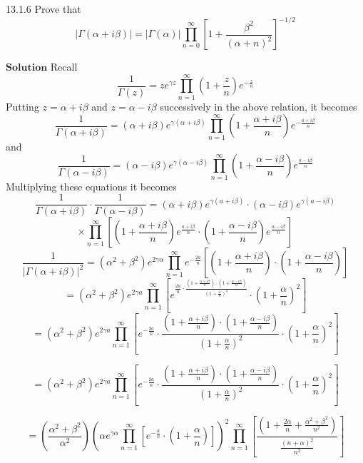 \documentclass{article}
\begin{document}
\begin{flushleft}
\newpage

\begin{mybox}{13.1.6}
Prove that 
$$|\Gamma(\alpha+i \beta)|=|\Gamma(\alpha)| \prod_{n=0}^{\infty}\left[1+\frac{\beta^{2}}{(\alpha+n)^{2}}\right]^{-1 / 2}$$
\end{mybox}

$\boxed{\textbf{Solution}}$ Recall 
$$
\frac{1}{\Gamma(z)}=z e^{\gamma z} \prod_{n=1}^{\infty}\left(1+\frac{z}{n}\right) e^{-\frac{z}{n}}
$$
Putting $z=\alpha+i \beta$ and $z=\alpha-i \beta$ successively in the above relation, it becomes
$$
\frac{1}{\Gamma(\alpha+i \beta)}=(\alpha+i \beta) e^{\gamma(\alpha+i \beta)} \prod_{n=1}^{\infty}\left(1+\frac{\alpha+i \beta}{n}\right) e^{-\frac{a+i \beta}{n}}
$$
and 
$$
\frac{1}{\Gamma(\alpha-i \beta)}=(\alpha-i \beta) e^{\gamma(\alpha-i \beta)} \prod_{n=1}^{\infty}\left(1+\frac{\alpha-i \beta}{n}\right) e^{\frac{a-i \beta}{n}}
$$
Multiplying these equations it becomes
$$
\frac{1}{\Gamma(\alpha+i \beta)} \cdot \frac{1}{\Gamma(\alpha-i \beta)}=(\alpha+i \beta) e^{\gamma(a+i \beta)} \cdot(\alpha-i \beta) e^{\gamma(a-i \beta)}$$
$$\times \prod_{n=1}^{\infty}\left[\left(1+\frac{\alpha+i \beta}{n}\right) e^{\frac{a+i \beta}{n}} \cdot\left(1+\frac{\alpha-i \beta}{n}\right) e^{\frac{\alpha-i \beta}{n}}\right]
$$
$$
\frac{1}{|\Gamma(\alpha+i \beta)|^{2}}=\left(\alpha^{2}+\beta^{2}\right) e^{2\gamma \alpha} \prod_{n=1}^{\infty} e^{-\frac{2 a}{n}}\left[\left(1+\frac{\alpha+i \beta}{n}\right) \cdot\left(1+\frac{\alpha-i \beta}{n}\right)\right]
$$
$$
=\left(\alpha^{2}+\beta^{2}\right) e^{2 \gamma a} \prod_{n=1}^{\infty}\left[e^{\frac{2 a}{n} \cdot \frac{\left(1+\frac{\alpha+i \beta}{n}\right) \cdot\left(1+\frac{\alpha-i \beta}{n}\right)}{\left(1+\frac{\alpha}{n}\right)^{2}}} \cdot\left(1+\frac{\alpha}{n}\right)^{2}\right]
$$
$$
=\left(\alpha^{2}+\beta^{2}\right) e^{2 \gamma a} \prod_{n=1}^{\infty}\left[e^{-\frac{2 a}{n}} \cdot \frac{\left(1+\frac{\alpha+i \beta}{n}\right) \cdot\left(1+\frac{\alpha-i \beta}{n}\right)}{\left(1+\frac{\alpha}{n}\right)^{2}} \cdot\left(1+\frac{\alpha}{n}\right)^{2}\right]
$$

$$
=\left(\alpha^{2}+\beta^{2}\right) e^{2 \gamma a} \prod_{n=1}^{\infty}\left[e^{-\frac{2 a}{n}} \cdot \frac{\left(1+\frac{\alpha+i \beta}{n}\right) \cdot\left(1+\frac{\alpha-i \beta}{n}\right)}{\left(1+\frac{\alpha}{n}\right)^{2}} \cdot\left(1+\frac{\alpha}{n}\right)^{2}\right]
$$

$$
=\left(\frac{\alpha^{2}+\beta^{2}}{\alpha^{2}}\right)\left(\alpha e^{\gamma \alpha} \prod_{n=1}^{\infty}\left[e^{-\frac{a}{n}} \cdot\left(1+\frac{\alpha}{n}\right)\right]\right)^{2} \prod_{n=1}^{\infty}\left[\frac{\left(1+\frac{2 \alpha}{n}+\frac{\alpha^{2}+\beta^{2}}{n^{2}}\right)}{\frac{(n+\alpha)^{2}}{n^{2}}}\right]
$$



\end{flushleft}
\end{document}
